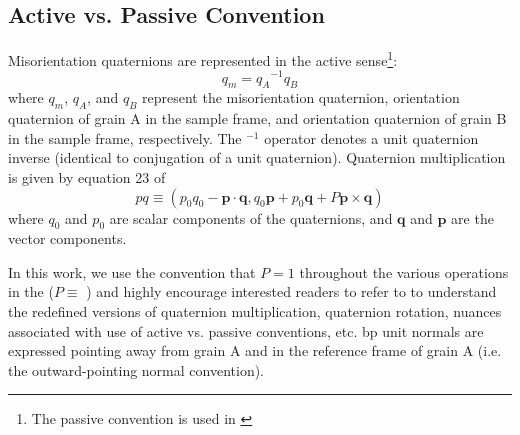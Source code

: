 \documentclass[final,twocolumn,12pt]{elsarticle}
\begin{document}
\begin{appendices}


\section{Active vs. Passive Convention}
\label{sec:app:convention}
Misorientation quaternions are represented in the active sense\footnote{The passive convention is used in \cite{francisGeodesicOctonionMetric2019}}:
\begin{equation}
    q_m = {q_A}^{-1}q_B
\end{equation}
where $q_m$, $q_A$, and $q_B$ represent the misorientation quaternion, orientation quaternion of grain A in the sample frame, and orientation quaternion of grain B in the sample frame, respectively. The $^{-1}$ operator denotes a unit quaternion inverse (identical to conjugation of a unit quaternion). Quaternion multiplication is given by equation 23 of \cite{rowenhorstConsistentRepresentationsConversions2015}
\begin{equation}
p q \equiv\left(p_{0} q_{0}-\mathbf{p} \cdot \mathbf{q}, q_{0} \mathbf{p}+p_{0} \mathbf{q}+P \mathbf{p} \times \mathbf{q}\right)
\end{equation}
where $q_0$ and $p_0$ are scalar components of the quaternions, and $\mathbf{q}$ and $\mathbf{p}$ are the vector components.

In this work, we use the convention that $P=1$ throughout the various operations in the \vfzorepo{} ($P \equiv $ ) and highly encourage interested readers to refer to \citet{rowenhorstConsistentRepresentationsConversions2015} to understand the redefined versions of quaternion multiplication, quaternion rotation, nuances associated with use of active vs. passive conventions, etc. \Gls{bp} unit normals are expressed pointing away from grain A and in the reference frame of grain A (i.e. the outward-pointing normal convention).




\end{appendices}
\end{document}
